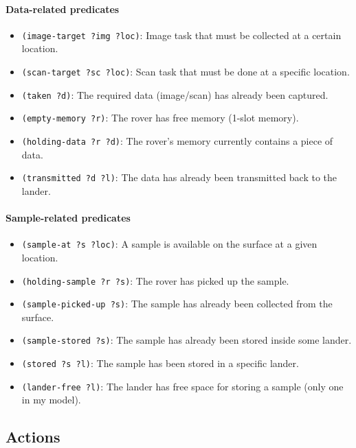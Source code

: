 \documentclass[11pt,a4paper]{article}
\newcommand{\pred}[1]{\texttt{(#1)}}
\begin{document}
\paragraph{Data-related predicates}
\begin{itemize}
  \item \pred{image-target ?img ?loc}: Image task that must be collected at a certain location.
  \item \pred{scan-target ?sc ?loc}: Scan task that must be done at a specific location.
  \item \pred{taken ?d}: The required data (image/scan) has already been captured.
  \item \pred{empty-memory ?r}: The rover has free memory (1-slot memory).
  \item \pred{holding-data ?r ?d}: The rover’s memory currently contains a piece of data.
  \item \pred{transmitted ?d ?l}: The data has already been transmitted back to the lander.
\end{itemize}

\paragraph{Sample-related predicates}
\begin{itemize}
  \item \pred{sample-at ?s ?loc}: A sample is available on the surface at a given location.
  \item \pred{holding-sample ?r ?s}: The rover has picked up the sample.
  \item \pred{sample-picked-up ?s}: The sample has already been collected from the surface.
  \item \pred{sample-stored ?s}: The sample has already been stored inside some lander.
  \item \pred{stored ?s ?l}: The sample has been stored in a specific lander.
  \item \pred{lander-free ?l}: The lander has free space for storing a sample (only one in my model).
\end{itemize}

\subsection*{Actions}
\end{document}
